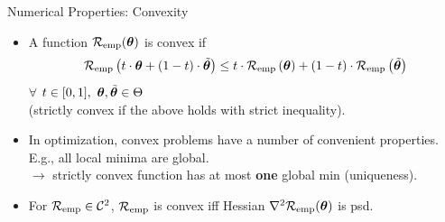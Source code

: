 \documentclass[11pt,compress,t,notes=noshow, xcolor=table]{beamer}
\begin{document}
\begin{vbframe}{Numerical Properties: Convexity}

\begin{itemize}
  \setlength\itemsep{1.2em}
  \item A function $\mathcal{R}_{\text{emp}}(\bm{\theta})$ is convex if
  $$
  \mathcal{R}_{\text{emp}}\left(t \cdot \bm{\theta} + (1 - t) \cdot \tilde {\bm{\theta}}\right) \le t \cdot
  \mathcal{R}_{\text{emp}}\left(\bm{\theta}\right) + (1 - t) \cdot \mathcal{R}_{\text{emp}}\left(\tilde {\bm{\theta}} \right)
  $$
  $\forall$ $t \in [0, 1], ~\bm{\theta}, \tilde {\bm{\theta}} \in \Theta$\\
  (strictly convex if the above holds with strict inequality).
  \item In optimization, convex problems have a number of convenient properties. E.g., all local minima are 
  global. \vspace{0.2cm }\\
  $\rightarrow$ strictly convex function has at most 
  \textbf{one} global min (uniqueness).
  \item For $\mathcal{R}_{\text{emp}} \in \mathcal{C}^{2}$, $\mathcal{R}_{\text{emp}}$ is convex iff Hessian $\nabla^2 \mathcal{R}_{\text{emp}}(\bm{\theta})$ is psd.
\end{itemize}

\end{vbframe}

\end{document}
